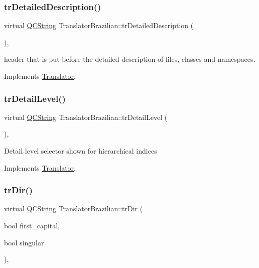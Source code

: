 \subsubsection{\texorpdfstring{trDetailedDescription()}{trDetailedDescription()}}
{\footnotesize\ttfamily virtual \mbox{\hyperlink{class_q_c_string}{Q\+C\+String}} Translator\+Brazilian\+::tr\+Detailed\+Description (\begin{DoxyParamCaption}{ }\end{DoxyParamCaption})\hspace{0.3cm}{\ttfamily [inline]}, {\ttfamily [virtual]}}

header that is put before the detailed description of files, classes and namespaces. 

Implements \mbox{\hyperlink{class_translator}{Translator}}.

\mbox{\label{class_translator_brazilian_aef48ed2ec8b8d9a72fc74fdb8f70ea19}} 
\subsubsection{\texorpdfstring{trDetailLevel()}{trDetailLevel()}}
{\footnotesize\ttfamily virtual \mbox{\hyperlink{class_q_c_string}{Q\+C\+String}} Translator\+Brazilian\+::tr\+Detail\+Level (\begin{DoxyParamCaption}{ }\end{DoxyParamCaption})\hspace{0.3cm}{\ttfamily [inline]}, {\ttfamily [virtual]}}

Detail level selector shown for hierarchical indices 

Implements \mbox{\hyperlink{class_translator}{Translator}}.

\mbox{\label{class_translator_brazilian_a3f5fce49618f873d0a918f112d2e6ada}} 
\subsubsection{\texorpdfstring{trDir()}{trDir()}}
{\footnotesize\ttfamily virtual \mbox{\hyperlink{class_q_c_string}{Q\+C\+String}} Translator\+Brazilian\+::tr\+Dir (\begin{DoxyParamCaption}\item[{bool}]{first\+\_\+capital,  }\item[{bool}]{singular }\end{DoxyParamCaption})\hspace{0.3cm}{\ttfamily [inline]}, {\ttfamily [virtual]}}

